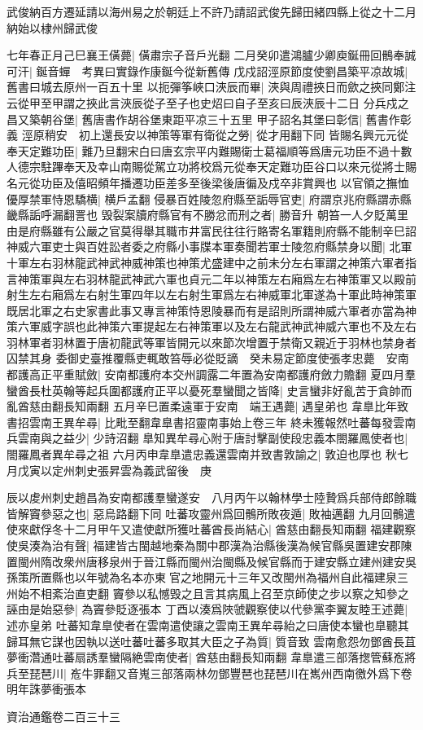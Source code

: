 武俊納百方遷延請以海州易之於朝廷上不許乃請詔武俊先歸田緒四縣上從之十二月納始以棣州歸武俊

七年春正月己巳襄王僙薨|{
	僙肅宗子音戶光翻}
二月癸卯遣鴻臚少卿庾鋋冊回鶻奉誠可汗|{
	鋋音蟬　考異曰實錄作康鋋今從新舊傳}
戊戍詔涇原節度使劉昌築平凉故城|{
	舊書曰城去原州一百五十里}
以扼彈筝峽口浹辰而畢|{
	浹與周禮挾日而歛之挾同鄭注云從甲至甲謂之挾此言浹辰從子至子也史炤曰自子至亥曰辰浹辰十二日}
分兵戍之昌又築朝谷堡|{
	舊唐書作胡谷堡東距平凉三十五里}
甲子詔名其堡曰彰信|{
	舊書作彰義}
涇原稍安　初上還長安以神策等軍有衛從之勞|{
	從才用翻下同}
皆賜名興元元從奉天定難功臣|{
	難乃旦翻宋白曰唐玄宗平内難賜衛士葛福順等爲唐元功臣不過十數人德宗駐蹕奉天及幸山南賜從駕立功將校爲元從奉天定難功臣谷口以來元從將士賜名元從功臣及僖昭頻年播遷功臣差多至後梁後唐徧及戍卒非賞興也}
以官領之撫恤優厚禁軍恃恩驕横|{
	横戶孟翻}
侵暴百姓陵忽府縣至詬辱官吏|{
	府謂京兆府縣謂赤縣畿縣詬呼漏翻詈也}
毁裂案牘府縣官有不勝忿而刑之者|{
	勝音升}
朝笞一人夕貶萬里由是府縣雖有公嚴之官莫得舉其職市井富民往往行賂寄名軍籍則府縣不能制辛巳詔神威六軍吏士與百姓訟者委之府縣小事牒本軍奏聞若軍士陵忽府縣禁身以聞|{
	北軍十軍左右羽林龍武神武神威神策也神策尤盛建中之前未分左右軍謂之神策六軍者指言神策軍與左右羽林龍武神武六軍也貞元二年以神策左右廂爲左右神策軍又以殿前射生左右廂爲左右射生軍四年以左右射生軍爲左右神威軍北軍遂為十軍此時神策軍既居北軍之右史家書此事又專言神策恃恩陵暴而有是詔則所謂神威六軍者亦當為神策六軍威字誤也此神策六軍提起左右神策軍以及左右龍武神武神威六軍也不及左右羽林軍者羽林置于唐初龍武等軍皆開元以來節次增置于禁衛又親近于羽林也禁身者囚禁其身}
委御史臺推覆縣吏輒敢笞辱必從貶謫　癸未易定節度使張孝忠薨　安南都護高正平重賦斂|{
	安南都護府本交州調露二年置為安南都護府斂力贍翻}
夏四月羣蠻酋長杜英翰等起兵圍都護府正平以憂死羣蠻聞之皆降|{
	史言蠻非好亂苦于貪帥而亂酋慈由翻長知兩翻}
五月辛巳置柔遠軍于安南　端王遇薨|{
	遇皇弟也}
韋臯比年致書招雲南王異牟尋|{
	比毗至翻韋臯書招靈南事始上卷三年}
終未獲報然吐蕃每發雲南兵雲南與之益少|{
	少詩沼翻}
臯知異牟尋心附于唐討擊副使段忠義本閤羅鳳使者也|{
	閤羅鳳者異牟尋之祖}
六月丙申韋臯遣忠義還雲南并致書敦諭之|{
	敦迫也厚也}
秋七月戊寅以定州刺史張昇雲為義武留後　庚

辰以䖍州刺史趙昌為安南都護羣蠻遂安　八月丙午以翰林學士陸贄爲兵部侍郎餘職皆解竇參惡之也|{
	惡烏路翻下同}
吐蕃攻靈州爲回鶻所敗夜遁|{
	敗袖邁翻}
九月回鶻遣使來獻俘冬十二月甲午又遣使獻所獲吐蕃酋長尚結心|{
	酋慈由翻長知兩翻}
福建觀察使吳湊為治有聲|{
	福建皆古閩越地秦為關中郡漢為治縣後漢為候官縣吳置建安郡陳置閩州隋改衆州唐移泉州于晉江縣而閩州治閩縣及候官縣而于建安縣立建州建安吳孫策所置縣也以年號為名本亦東官之地開元十三年又改閩州為福州自此福建泉三州始不相紊治直吏翻}
竇參以私憾毁之且言其病風上召至京師使之步以察之知參之誣由是始惡參|{
	為竇參貶逐張本}
丁酉以湊爲陜虢觀察使以代參黨李翼友睦王述薨|{
	述亦皇弟}
吐蕃知韋臯使者在雲南遣使讓之雲南王異牟尋紿之曰唐使本蠻也臯聽其歸耳無它謀也因執以送吐蕃吐蕃多取其大臣之子為質|{
	質音致}
雲南愈怨勿鄧酋長苴夢衝濳通吐蕃扇誘羣蠻隔絶雲南使者|{
	酋慈由翻長知兩翻}
韋臯遣三部落揔管蘇峞將兵至琵琶川|{
	峞牛罪翻又音嵬三部落兩林勿鄧豐琶也琵琶川在嶲州西南徼外爲下卷明年誅夢衝張本}


資治通鑑卷二百三十三
